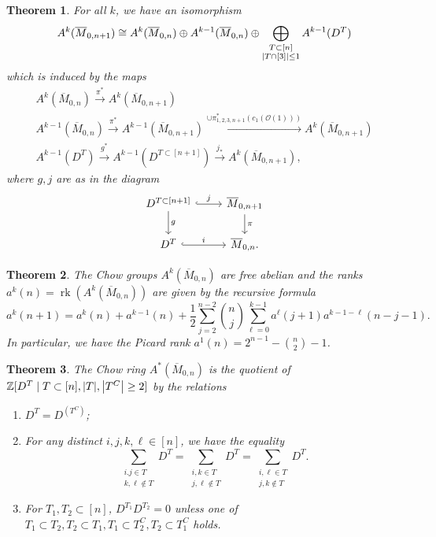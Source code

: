 \documentclass[leqno, openany]{memoir}
\newtheorem{thm}{Theorem}[section]
\theoremstyle{definition}
\theoremstyle{remark}
\theoremstyle{plain}
\theoremstyle{definition}
\theoremstyle{remark}
\newcommand{\Z}{\mathbb{Z}}
\newcommand{\mc}[1]{\mathcal{#1}}
\newcommand{\ol}[1]{\overline{#1}}
\begin{document}
\begin{thm}
    For all $k$, we have an isomorphism
    \[ A^k(\ol{M}_{0,n+1}) \cong A^k(\ol{M}_{0,n}) \oplus A^{k-1}(\ol{M}_{0,n}) \oplus \bigoplus_{\substack{T \subset [n] \\ \abs{T \cap [3]} \leq 1}} A^{k-1}(D^T) \]
    which is induced by the maps
    \begin{align*}
        A^k(\ol{M}_{0,n}) \xrightarrow{\pi^*} A^k(\ol{M}_{0,n+1}) \\
        A^{k-1}(\ol{M}_{0,n}) \xrightarrow{\pi^*} A^{k-1}(\ol{M}_{0,n+1}) \xrightarrow{\cup \pi_{1,2,3,n+1}^* (c_1(\mc{O}(1)))} A^k(\ol{M}_{0,n+1}) \\
        A^{k-1}(D^T) \xrightarrow{g^*} A^{k-1}(D^{T \subset [n+1]}) \xrightarrow{j_*} A^k(\ol{M}_{0,n+1}),
    \end{align*}
    where $g,j$ are as in the diagram
    \begin{equation*}
    \begin{tikzcd}
        D^{T \subset [n+1]} \ar{d}{g} \ar[hookrightarrow]{r}{j} & \ol{M}_{0,n+1} \ar{d}{\pi} \\
        D^T \ar[hookrightarrow]{r}{i} & \ol{M}_{0,n}.
    \end{tikzcd}
    \end{equation*}
\end{thm}

\begin{thm}
    The Chow groups $A^k(\ol{M}_{0,n})$ are free abelian and the ranks $a^k(n) = \operatorname{rk}(A^k(\ol{M}_{0,n}))$ are given by the recursive formula
    \[ a^k(n+1) = a^k(n) + a^{k-1}(n) + \frac{1}{2} \sum_{j=2}^{n-2} \binom{n}{j} \sum_{\ell=0}^{k-1} a^{\ell}(j+1) a^{k-1-\ell}( n-j-1 ). \]
    In particular, we have the Picard rank $a^1(n) = 2^{n-1} - \binom{n}{2} - 1$.
\end{thm}

\begin{thm}
    The Chow ring $A^*(\ol{M}_{0,n})$ is the quotient of $\Z[D^T \mid T \subset [n], \abs{T}, \abs{T^C} \geq 2]$
    by the relations
    \begin{enumerate}
        \item $D^T = D^{(T^C)}$;
        \item For any distinct $i,j,k,\ell \in [n]$, we have the equality
            \[ \sum_{\substack{i.j\in T \\ k,\ell \notin T}} D^T = \sum_{\substack{i,k\in T \\ j,\ell \notin T}} D^T = \sum_{\substack{i,\ell \in T \\ j,k \notin T}} D^T. \]
        \item For $T_1, T_2 \subset [n]$, $D^{T_1} D^{T_2} = 0$ unless one of $T_1 \subset T_2, T_2 \subset T_1, T_1 \subset T_2^C, T_2 \subset T_1^C$ holds.
    \end{enumerate}
\end{thm}
\end{document}
